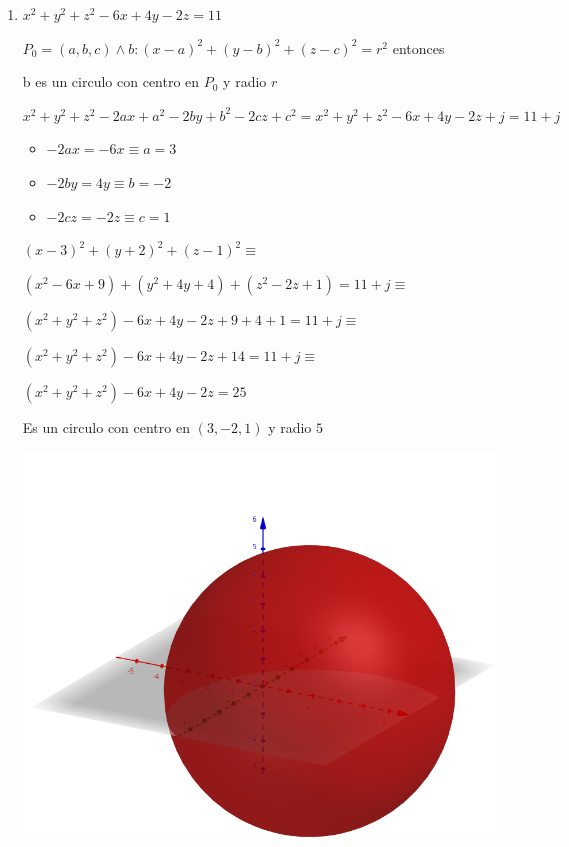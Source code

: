 \documentclass[../practica_01.tex]{subfiles}
\begin{document}
    \begin{enumerate}
        \item $x^2+y^2+z^2-6x+4y-2z = 11$

            $P_0 = (a,b,c) \wedge b: (x-a)^2+(y-b)^2+(z-c)^2 = r^2$ entonces

            b es un circulo con centro en $P_0$ y radio $r$

            $x^2 + y^2 + z^2 - 2ax + a^2 - 2by + b^2 - 2cz + c^2 = x^2 + y^2 + z^2 - 6x + 4y - 2z + j = 11 + j$

            \begin{itemize}
                \item $-2ax = -6x \equiv a = 3$
                \item $-2by = 4y \equiv b = -2$
                \item $-2cz = -2z \equiv c = 1$
            \end{itemize}

            $(x-3)^2+(y+2)^2+(z-1)^2 \equiv$
            
            $(x^2 - 6x + 9) + (y^2 + 4y + 4) + (z^2 - 2z + 1) = 11 + j \equiv$
            
            $(x^2 + y^2 + z^2) - 6x + 4y - 2z + 9 + 4 + 1 = 11 + j \equiv$

            $(x^2 + y^2 + z^2) - 6x + 4y - 2z + 14 = 11 + j \equiv $

            $(x^2 + y^2 + z^2) - 6x + 4y - 2z = 25$
            
            Es un circulo con centro en $(3,-2,1)$ y radio $5$

            \includegraphics[scale=0.2]{ej02/resources/2a.png} $ $


\end{enumerate}
\end{document}
